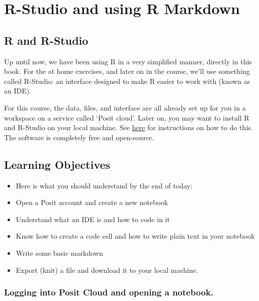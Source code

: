 \documentclass[
  letterpaper,
  DIV=11,
  numbers=noendperiod]{scrreprt}
\newenvironment{Shaded}{\begin{snugshade}}{\end{snugshade}}
\begin{document}
\begin{Shaded}
\begin{Highlighting}[]

\end{Highlighting}
\end{Shaded}

\chapter{R-Studio and using R
Markdown}\label{r-studio-and-using-r-markdown}

\section{R and R-Studio}\label{r-and-r-studio}

Up until now, we have been using R in a very simplified manner, directly
in this book. For the at home exercises, and later on in the course,
we'll use something called R-Studio: an interface designed to make R
easier to work with (known as an IDE).

For this course, the data, files, and interface are all already set up
for you in a workspace on a service called `Posit cloud'. Later on, you
may want to install R and R-Studio on your local machine. See
\href{https://posit.co/download/rstudio-desktop/}{here} for instructions
on how to do this. The software is completely free and open-source.

\section{Learning Objectives}\label{learning-objectives-2}

\begin{itemize}
\item
  Here is what you should understand by the end of today:
\item
  Open a Posit account and create a new notebook
\item
  Understand what an IDE is and how to code in it
\item
  Know how to create a code cell and how to write plain text in your
  notebook
\item
  Write some basic markdown
\item
  Export (knit) a file and download it to your local machine.
\end{itemize}

\subsection{Logging into Posit Cloud and opening a
notebook.}\label{logging-into-posit-cloud-and-opening-a-notebook.}
\end{document}

